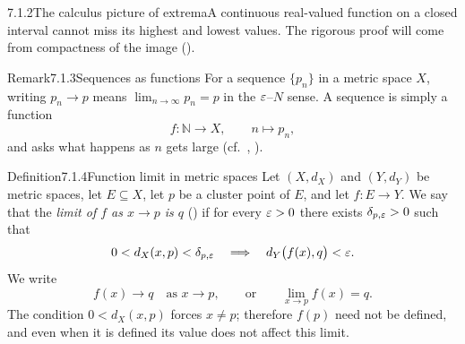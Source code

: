 \documentclass[main.tex]{subfiles}
\begin{document}
\begin{Fig}{7.1.2}{The calculus picture of extrema}{A continuous real-valued function on a
closed interval cannot miss its highest and lowest values. The rigorous proof will come from
compactness of the image ().}
\end{Fig}

\begin{ObjL}{Remark}{7.1.3}{Sequences as functions}
For a sequence $\{p_n\}$ in a metric space $X$, writing $p_n\to p$ means
$\lim_{n\to\infty}p_n=p$ in the $\varepsilon$--$N$ sense. A sequence is simply a function
\[
  f:\mathbb N\to X,\qquad n\mapsto p_n,
\]
and asks what happens as $n$ gets large (cf.\ , ).
\end{ObjL}

\begin{Obj}{Definition}{7.1.4}{Function limit in metric spaces}
Let $(X,d_X)$ and $(Y,d_Y)$ be metric spaces, let $E\subseteq X$, let $p$ be a cluster point of
$E$, and let $f:E\to Y$. We say that the \emph{limit of $f$ as $x\to p$ is $q$}
() if for every
$\varepsilon>0$ there exists $\delta_{p,\varepsilon}>0$ such that
\[
  0<d_X(x,p)<\delta_{p,\varepsilon}
  \quad\Longrightarrow\quad
  d_Y\bigl(f(x),q\bigr)<\varepsilon .
\]
We write
\[
  f(x)\to q\quad\text{as }x\to p,
  \qquad\text{or}\qquad
  \lim_{x\to p}f(x)=q .
\]
The condition $0<d_X(x,p)$ forces $x\ne p$; therefore $f(p)$ need not be defined, and even when
it is defined its value does not affect this limit.
\end{Obj}
\end{document}
